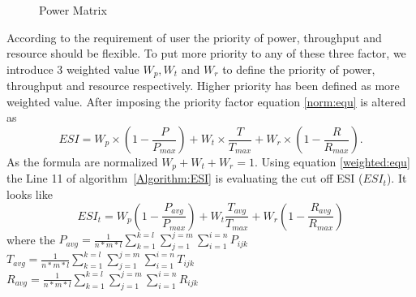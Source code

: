 \documentclass[3p,times]{elsarticle}
\begin{document}
\begin{figure}[!htb]
\label{fig:power_mat}
\caption{Power Matrix}
\end{figure}
According to the requirement of user the priority of power, throughput and resource should be flexible. To put more priority to any of these three factor, we introduce 3 weighted value $W_p, W_t$ and $W_r$ to define the priority of power, throughput and resource respectively. Higher priority has been defined as more weighted value. After imposing the priority factor equation \ref{norm:equ} is altered as  
\begin{equation}
ESI=W_p\times(1-\frac{P}{P_{max}}) + W_t\times \frac{T}{T_{max}} + W_r\times (1-\frac{R}{R_{max}}).
\label{weighted:equ}
\end{equation}
As the formula are normalized $W_p+W_t+W_r=1$. Using equation \ref{weighted:equ} the Line 11 of algorithm~\ref{Algorithm:ESI} is evaluating the cut off ESI ($ESI_t$). It looks like\\
\begin{equation}
ESI_t=W_p(1-\frac{P_{avg}}{P_{max}})+W_t\frac{T_{avg}}{T_{max}}+W_r(1-\frac{R_{avg}}{R_{max}})
\label{esit:equ}
\end{equation}
where the $ P_{avg}=\frac{1}{n*m*l}\sum_{k=1}^{k=l}\sum_{j=1}^{j=m}\sum_{i=1}^{i=n}P_{ijk}$\\
$ T_{avg}=\frac{1}{n*m*l}\sum_{k=1}^{k=l}\sum_{j=1}^{j=m}\sum_{i=1}^{i=n}T_{ijk}$\\
$ R_{avg}=\frac{1}{n*m*l}\sum_{k=1}^{k=l}\sum_{j=1}^{j=m}\sum_{i=1}^{i=n}R_{ijk}$\\
\end{document}
